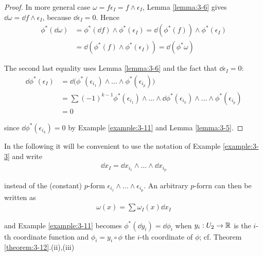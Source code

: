 \begin{proof}
In more general case $\omega = f\epsilon_I = f\wedge\epsilon_I$, Lemma \ref{lemma:3-6} gives  
$\dd\omega = \dd f\wedge\epsilon_I$, because $\dd\epsilon_I = 0$. Hence
\begin{align*}
  \phi^*(\!\dd\omega) 
  & = \phi^*(\!\dd f)\wedge\phi^*(\epsilon_I)
      = \dd(\phi^*(f))\wedge\phi^*(\epsilon_I) \\
  & = \dd(\phi^*(f)\wedge\phi^*(\epsilon_I))
    = \dd(\phi^*\omega)
\end{align*}

The second last equality uses Lemma \ref{lemma:3-6} and the fact that $\dd\epsilon_I = 0$:
\begin{align*}
  \dd\phi^{*}(\epsilon_{I})
  & = \dd\big(\phi^{*}(\epsilon_{i_{1}})\wedge\ldots\wedge\phi^{*}(\epsilon_{i_{p}})\big) \\
  & = \sum\left(-1\right)^{k-1}\phi^{*}(\epsilon_{i_{1}})\wedge\ldots\wedge\!\dd\phi^{*}(\epsilon_{i_{k}})\wedge\ldots\wedge\phi^{*}(\epsilon_{i_{p}})\\
  & = 0
\end{align*}  

since $\dd\phi^*(\epsilon_{i_k}) = 0$ by Example \ref{example:3-11} and Lemma \ref{lemma:3-5}.
\end{proof}


In the following it will be convenient to use the notation of Example \ref{example:3-3} and write
\begin{align*}
  \dd x_I = \dd x_{i_1}\wedge\ldots\wedge\!\dd x_{i_p}
\end{align*}

instead of the (constant) $p$-form $\epsilon_{i_1}\wedge\ldots\wedge\epsilon_{i_p}$. An arbitrary 
$p$-forrn can then be written as
\begin{align*}
  \omega(x) = \sum{\omega_I(x)\dd x_I}
\end{align*}

and Example \ref{example:3-11} becomes $\phi^*(\!\dd y_i) = \dd\phi_i$ when $y_i:U_2\to{\ensuremath{\mathbb{R}}}$ is 
the $i$-th coordinate function and $\phi_i = y_i\circ\phi$ the $i$-th coordinate of $\phi$; 
cf. Theorem \ref{theorem:3-12}.(ii),(iii)

